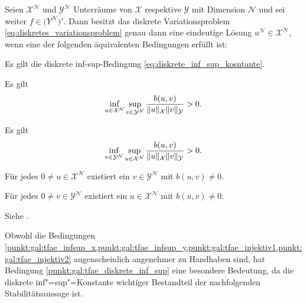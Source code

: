 \documentclass[../main.tex]{subfiles}
\begin{document}
\begin{Satz}
\label{satz:galerkin_wohldefiniertheit}
    Seien $\mathcal X^{\mathcal N}$ und $\mathcal Y^{\mathcal N}$ Unterräume von $\mathcal X$ respektive $\mathcal Y$ mit Dimension $\mathcal N$ und sei weiter $f \in \mathcal (Y^{\mathcal N})'$.
    Dann besitzt das diskrete Variationsproblem \cref{eq:diskretes_variationsproblem} genau dann eine eindeutige Lösung $u^{\mathcal N} \in \mathcal X^{\mathcal N}$, wenn eine der folgenden äquivalenten Bedingungen erfüllt ist:
    \begin{thmenumerate}
        \item \label{punkt:gal:tfae_diskrete_inf_sup} Es gilt die diskrete inf-sup-Bedingung \cref{eq:diskrete_inf_sup_kosntante}.
        \item \label{punkt:gal:tfae_infsup_x} Es gilt
            \begin{equation}
                \inf_{u \in \mathcal X^{\mathcal N}} \sup_{v \in \mathcal Y^{\mathcal N}} \frac{b(u, v)}{\lVert u\rVert_{\mathcal X} \lVert v\rVert_{\mathcal Y}} > 0.
            \end{equation}
        \item \label{punkt:gal:tfae_infsup_y} Es gilt
            \begin{equation}
                \inf_{v \in \mathcal Y^{\mathcal N}} \sup_{u \in \mathcal X^{\mathcal N}} \frac{b(u, v)}{\lVert u\rVert_{\mathcal X} \lVert v\rVert_{\mathcal Y}} > 0.
            \end{equation}
        \item \label{punkt:gal:tfae_injektiv1} Für jedes $0 \neq u \in \mathcal X^{\mathcal N}$ existiert ein $v \in \mathcal Y^{\mathcal N}$ mit $b(u, v) \neq 0$.
        \item \label{punkt:gal:tfae_injektiv2} Für jedes $0 \neq v \in \mathcal Y^{\mathcal N}$ existiert ein $u \in \mathcal X^{\mathcal N}$ mit $b(u, v) \neq 0$.
    \end{thmenumerate}

    \begin{Beweis}
        Siehe \cite[Theorem 3.1, Proposition 3.1]{Nochetto:2009il}.
    \end{Beweis}
\end{Satz}

Obwohl die Bedingungen \cref{punkt:gal:tfae_infsup_x,punkt:gal:tfae_infsup_y,punkt:gal:tfae_injektiv1,punkt:gal:tfae_injektiv2} augenscheinlich angenehmer zu Handhaben sind, hat Bedingung \cref{punkt:gal:tfae_diskrete_inf_sup} eine besondere Bedeutung, da die diskrete inf"=sup"=Konstante wichtiger Bestandteil der nachfolgenden Stabilitätsaussage ist.
\end{document}
